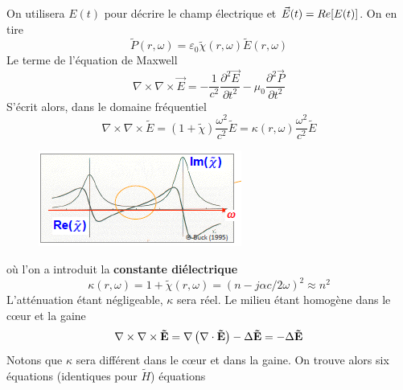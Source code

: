 On utilisera $E(t)$ pour décrire le champ électrique et $\vec{E}{\rm{(}}t{\rm{)}} = Re{\rm{[}}E{\rm{(}}t{\rm{)]}}$. On en tire
\begin{equation}
\tilde P\left( {r,\omega } \right) = {\varepsilon _0}\tilde \chi \left( {r,\omega } \right)\tilde E\left( {r,\omega } \right)
\end{equation}
Le terme de l'équation de Maxwell
\begin{equation}
\nabla  \times \nabla  \times \vec{E} =  - \frac{1}{{{c^2}}}\frac{{{\partial ^2}\vec{E}}}{{\partial {t^2}}} - {\mu _0}\frac{{{\partial ^2}\vec{P}}}{{\partial {t^2}}}
\end{equation}
S'écrit alors, dans le domaine fréquentiel
\begin{equation}
\nabla  \times \nabla  \times \tilde E = \left( {1 + \tilde \chi } \right)\frac{{{\omega ^2}}}{{{c^2}}}\tilde E = \kappa \left( {r,\omega } \right)\frac{{{\omega ^2}}}{{{c^2}}}\tilde E
\end{equation}


\begin{figure}
	\vspace{-5mm}
	\includegraphics[scale=0.8]{ch1/image11.png}
	\end{figure}
où l'on a introduit la \textbf{constante diélectrique}
\begin{equation}
\kappa \left( {r,\omega } \right) = 1 + \tilde \chi \left( {r,\omega } \right) = {(n - j\alpha c/2\omega )^2} \approx {n^2}
\end{equation}
L'atténuation étant négligeable, $\kappa$ sera réel. Le milieu étant homogène dans le
cœur et la gaine
\begin{equation}
\nabla  \times \nabla  \times {\bf{\tilde E}} = \nabla \left( {\nabla  \cdot {\bf{\tilde E}}} \right) - \Delta {\bf{\tilde E}} =  - \Delta {\bf{\tilde E}}
\end{equation}
Notons que $\kappa$ sera différent dans le cœur et dans la gaine. On trouve alors six équations (identiques pour $\tilde{H}$) équations\\

